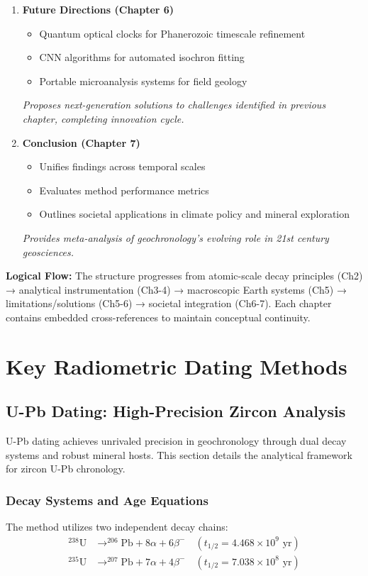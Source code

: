 \documentclass{article}
\begin{document}
\begin{enumerate}
    \item \textbf{Future Directions (Chapter 6)}
    \begin{itemize}
        \item Quantum optical clocks for Phanerozoic timescale refinement
        \item CNN algorithms for automated isochron fitting
        \item Portable microanalysis systems for field geology
    \end{itemize}
    \textit{Proposes next-generation solutions to challenges identified in previous chapter, completing innovation cycle.}

    \item \textbf{Conclusion (Chapter 7)}
    \begin{itemize}
        \item Unifies findings across temporal scales
        \item Evaluates method performance metrics
        \item Outlines societal applications in climate policy and mineral exploration
    \end{itemize}
    \textit{Provides meta-analysis of geochronology's evolving role in 21st century geosciences.}
\end{enumerate}

\textbf{Logical Flow:} The structure progresses from atomic-scale decay principles (Ch2) → analytical instrumentation (Ch3-4) → macroscopic Earth systems (Ch5) → limitations/solutions (Ch5-6) → societal integration (Ch6-7). Each chapter contains embedded cross-references to maintain conceptual continuity.



\section{Key Radiometric Dating Methods}
\subsection{U-Pb Dating: High-Precision Zircon Analysis}
\label{subsec:upb_method}

U-Pb dating achieves unrivaled precision in geochronology through dual decay systems and robust mineral hosts. This section details the analytical framework for zircon U-Pb chronology.

\subsubsection*{Decay Systems and Age Equations}
The method utilizes two independent decay chains:
\begin{align}
    ^{238}\text{U} &\rightarrow ^{206}\text{Pb} + 8\alpha + 6\beta^- \quad (t_{1/2} = 4.468 \times 10^9 \text{ yr}) \label{eq:238decay} \\
    ^{235}\text{U} &\rightarrow ^{207}\text{Pb} + 7\alpha + 4\beta^- \quad (t_{1/2} = 7.038 \times 10^8 \text{ yr}) \label{eq:235decay}
\end{align}
\end{document}
